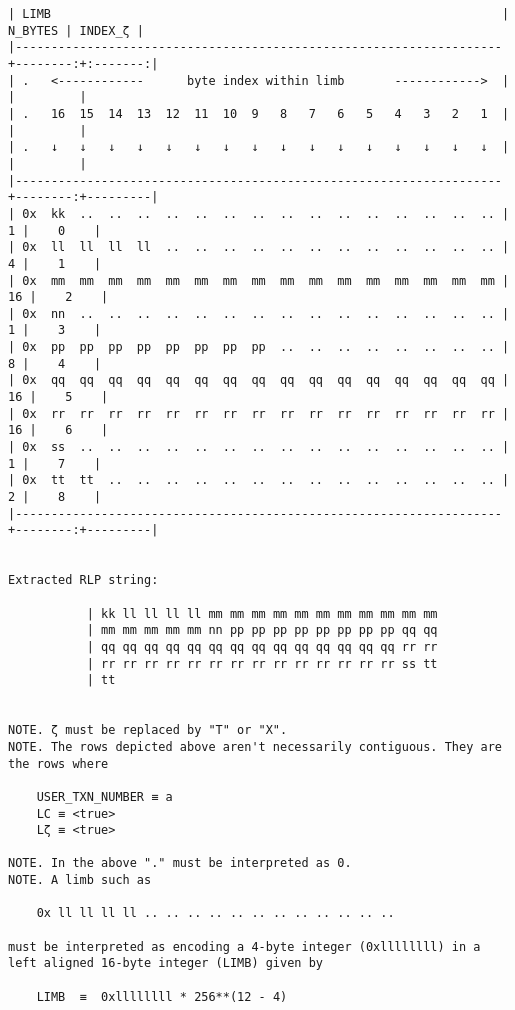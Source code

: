 \documentclass[varwidth=\maxdimen,margin=0.5cm,multi={verbatim}]{standalone}
\begin{document}
\begin{verbatim}
| LIMB                                                               | N_BYTES | INDEX_ζ |
|--------------------------------------------------------------------+--------:+:-------:|
| .   <------------      byte index within limb       ------------>  |         |         |
| .   16  15  14  13  12  11  10  9   8   7   6   5   4   3   2   1  |         |         |
| .   ↓   ↓   ↓   ↓   ↓   ↓   ↓   ↓   ↓   ↓   ↓   ↓   ↓   ↓   ↓   ↓  |         |         |
|--------------------------------------------------------------------+--------:+---------|
| 0x  kk  ..  ..  ..  ..  ..  ..  ..  ..  ..  ..  ..  ..  ..  ..  .. |       1 |    0    |
| 0x  ll  ll  ll  ll  ..  ..  ..  ..  ..  ..  ..  ..  ..  ..  ..  .. |       4 |    1    |
| 0x  mm  mm  mm  mm  mm  mm  mm  mm  mm  mm  mm  mm  mm  mm  mm  mm |      16 |    2    |
| 0x  nn  ..  ..  ..  ..  ..  ..  ..  ..  ..  ..  ..  ..  ..  ..  .. |       1 |    3    |
| 0x  pp  pp  pp  pp  pp  pp  pp  pp  ..  ..  ..  ..  ..  ..  ..  .. |       8 |    4    |
| 0x  qq  qq  qq  qq  qq  qq  qq  qq  qq  qq  qq  qq  qq  qq  qq  qq |      16 |    5    |
| 0x  rr  rr  rr  rr  rr  rr  rr  rr  rr  rr  rr  rr  rr  rr  rr  rr |      16 |    6    |
| 0x  ss  ..  ..  ..  ..  ..  ..  ..  ..  ..  ..  ..  ..  ..  ..  .. |       1 |    7    |
| 0x  tt  tt  ..  ..  ..  ..  ..  ..  ..  ..  ..  ..  ..  ..  ..  .. |       2 |    8    |
|--------------------------------------------------------------------+--------:+---------|


Extracted RLP string:

           | kk ll ll ll ll mm mm mm mm mm mm mm mm mm mm mm
           | mm mm mm mm mm nn pp pp pp pp pp pp pp pp qq qq
           | qq qq qq qq qq qq qq qq qq qq qq qq qq qq rr rr
           | rr rr rr rr rr rr rr rr rr rr rr rr rr rr ss tt
           | tt


NOTE. ζ must be replaced by "T" or "X".
NOTE. The rows depicted above aren't necessarily contiguous. They are the rows where

    USER_TXN_NUMBER ≡ a
    LC ≡ <true>
    Lζ ≡ <true>

NOTE. In the above "." must be interpreted as 0.
NOTE. A limb such as

    0x ll ll ll ll .. .. .. .. .. .. .. .. .. .. .. ..

must be interpreted as encoding a 4-byte integer (0xllllllll) in a left aligned 16-byte integer (LIMB) given by

    LIMB  ≡  0xllllllll * 256**(12 - 4)

\end{verbatim}
\end{document}
